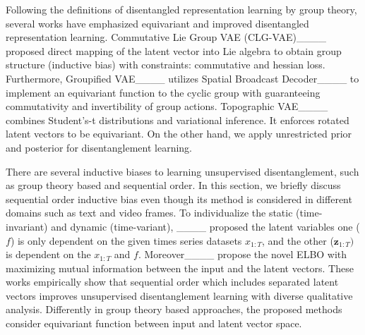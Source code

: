 Following the definitions of disentangled representation learning by group theory, several works have emphasized equivariant and improved disentangled representation learning.
Commutative Lie Group VAE (CLG-VAE)____ proposed direct mapping of the latent vector into Lie algebra to obtain group structure (inductive bias) with constraints: commutative and hessian loss.
Furthermore, Groupified VAE____ utilizes Spatial Broadcast Decoder____ to implement an equivariant function to the cyclic group with guaranteeing commutativity and invertibility of group actions.
Topographic VAE____ combines Student's-t distributions and variational inference. 
It enforces rotated latent vectors to be equivariant.
On the other hand, we apply unrestricted prior and posterior for disentanglement learning.

There are several inductive biases to learning unsupervised disentanglement, such as group theory based and sequential order.
In this section, we briefly discuss sequential order inductive bias even though its method is considered in different domains such as text and video frames.
To individualize the static (time-invariant) and dynamic (time-variant), ____ proposed the latent variables one ($f$) is only dependent on the given times series datasets $x_{1:T}$, and the other ($\mathbf{z}_{1:T})$ is dependent on the $x_{1:T}$ and $f$.
Moreover____ propose the novel ELBO with maximizing mutual information between the input and the latent vectors.
These works empirically show that sequential order which includes separated latent vectors improves unsupervised disentanglement learning with diverse qualitative analysis.
Differently in group theory based approaches, the proposed methods consider equivariant function between input and latent vector space.


